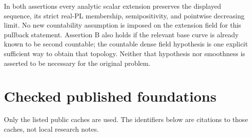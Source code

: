 \documentclass[
  11pt,
]{article}
\begin{document}
In both assertions every analytic scalar extension preserves the
displayed sequence, its strict real-PL membership, semipositivity, and
pointwise decreasing limit. No new countability assumption is imposed on
the extension field for this pullback statement. Assertion B also holds
if the relevant base curve is already known to be second countable; the
countable dense field hypothesis is one explicit sufficient way to
obtain that topology. Neither that hypothesis nor smoothness is asserted
to be necessary for the original problem.

\section{Checked published
foundations}\label{checked-published-foundations}

Only the listed public caches are used. The identifiers below are
citations to those caches, not local research notes.
\end{document}
